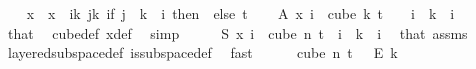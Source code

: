 \begin{isabellebody}
%
\isadelimproof
%
\endisadelimproof
%
\isatagproof
{}\isamarkupfalse%
{\isacharminus}{\kern0pt}\isanewline
\ \ \isamarkupfalse%
\ x\ \ {\isachardoublequoteopen}x\ {\isasymequiv}\ {\isacharparenleft}{\kern0pt}{\isasymlambda}i{\isasymin}{\isacharbraceleft}{\kern0pt}{\isachardot}{\kern0pt}{\isachardot}{\kern0pt}k{\isacharbraceright}{\kern0pt}{\isachardot}{\kern0pt}\ {\isasymlambda}j{\isasymin}{\isacharbraceleft}{\kern0pt}{\isachardot}{\kern0pt}{\isachardot}{\kern0pt}{\isacharless}{\kern0pt}k{\isacharbraceright}{\kern0pt}{\isachardot}{\kern0pt}\ {\isacharparenleft}{\kern0pt}if\ j\ {\isacharless}{\kern0pt}\ k\ {\isacharminus}{\kern0pt}\ i\ then\ {}\ else\ t{\isacharparenright}{\kern0pt}{\isacharparenright}{\kern0pt}{\isachardoublequoteclose}\isanewline
\isanewline
\ \ \isamarkupfalse%
\ A{\isacharcolon}{\kern0pt}\ {\isachardoublequoteopen}x\ i\ {\isasymin}\ cube\ k\ {\isacharparenleft}{\kern0pt}t\ {\isacharplus}{\kern0pt}\ {}{\isacharparenright}{\kern0pt}{\isachardoublequoteclose}\ \ {\isachardoublequoteopen}i\ {\isasymle}\ k{\isachardoublequoteclose}\ \ i\ \isamarkupfalse%
\ that\ \isamarkupfalse%
\ cube{\isacharunderscore}{\kern0pt}def\ x{\isacharunderscore}{\kern0pt}def\ \isamarkupfalse%
\ simp\isanewline
\ \ \isamarkupfalse%
\ \isamarkupfalse%
\ {\isachardoublequoteopen}S\ {\isacharparenleft}{\kern0pt}x\ i{\isacharparenright}{\kern0pt}\ {\isasymin}\ cube\ n\ {\isacharparenleft}{\kern0pt}t{\isacharplus}{\kern0pt}{}{\isacharparenright}{\kern0pt}{\isachardoublequoteclose}\ \ {\isachardoublequoteopen}i\ {\isasymle}\ k{\isachardoublequoteclose}\ \ i\ \isamarkupfalse%
\ that\ assms{\isacharparenleft}{\kern0pt}{}{\isacharparenright}{\kern0pt}\ \isamarkupfalse%
\ layered{\isacharunderscore}{\kern0pt}subspace{\isacharunderscore}{\kern0pt}def\ is{\isacharunderscore}{\kern0pt}subspace{\isacharunderscore}{\kern0pt}def\ \isamarkupfalse%
\ fast\isanewline
\isanewline
\ \ \isamarkupfalse%
\ {\isachardoublequoteopen}{\isasymchi}\ {\isasymin}\ cube\ n\ {\isacharparenleft}{\kern0pt}t\ {\isacharplus}{\kern0pt}\ {}{\isacharparenright}{\kern0pt}\ {\isasymrightarrow}\isactrlsub E\ {\isacharbraceleft}{\kern0pt}{\isachardot}{\kern0pt}{\isachardot}{\kern0pt}{\isacharless}{\kern0pt}k{\isacharbraceright}{\kern0pt}{\isachardoublequoteclose}\ \isamarkupfalse%

\end{isabellebody}
